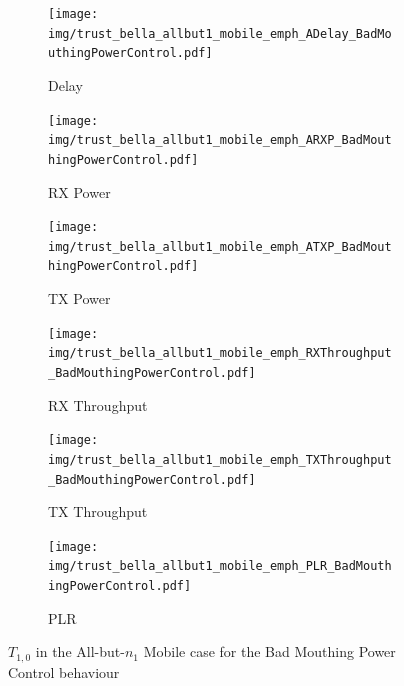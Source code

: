 \documentclass[runningheads,a4paper]{llncs}
\begin{document}
\begin{figure}
\begin{subfigure}{0.32\textwidth}
  \centering
  \texttt{[image: img/trust\_bella\_allbut1\_mobile\_emph\_ADelay\_BadMouthingPowerControl.pdf]}
  \caption{Delay}
  \label{fig:allbut1_mobile_badmouthing_delay}
\end{subfigure}
\begin{subfigure}{0.32\textwidth}
\centering
  \texttt{[image: img/trust\_bella\_allbut1\_mobile\_emph\_ARXP\_BadMouthingPowerControl.pdf]}
  \caption{RX Power}
  \label{fig:allbut1_mobile_badmouthing_rxp}
\end{subfigure}
\begin{subfigure}{0.32\textwidth}
\centering
  \texttt{[image: img/trust\_bella\_allbut1\_mobile\_emph\_ATXP\_BadMouthingPowerControl.pdf]}
  \caption{TX Power}
  \label{fig:allbut1_mobile_badmouthing_txp}
\end{subfigure}
\begin{subfigure}{0.32\textwidth}
\centering
  \texttt{[image: img/trust\_bella\_allbut1\_mobile\_emph\_RXThroughput\_BadMouthingPowerControl.pdf]}
  \caption{RX Throughput}
  \label{fig:allbut1_mobile_badmouthing_rxthroughput}
\end{subfigure}
\begin{subfigure}{0.32\textwidth}
\centering
  \texttt{[image: img/trust\_bella\_allbut1\_mobile\_emph\_TXThroughput\_BadMouthingPowerControl.pdf]}
  \caption{TX Throughput}
  \label{fig:allbut1_mobile_badmouthing_txthroughput}
\end{subfigure}
\begin{subfigure}{0.32\textwidth}
\centering
  \texttt{[image: img/trust\_bella\_allbut1\_mobile\_emph\_PLR\_BadMouthingPowerControl.pdf]}
  \caption{PLR}
  \label{fig:allbut1_mobile_badmouthing_plr}
\end{subfigure}
\caption{$T_{1,0}$ in the All-but-$n_1$ Mobile case for the Bad Mouthing Power Control behaviour}
\label{fig:allbut1_mobile_badmouthing}
\end{figure}
\end{document}
